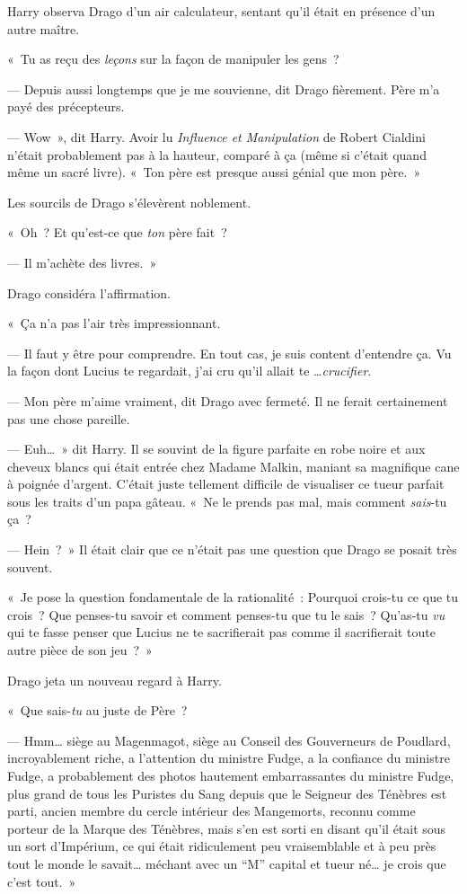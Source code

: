 Harry observa Drago d'un air calculateur, sentant qu'il était en présence d'un autre maître.

«~Tu as reçu des \emph{leçons} sur la façon de manipuler les gens~?

--- Depuis aussi longtemps que je me souvienne, dit Drago fièrement. Père m'a payé des précepteurs.

--- Wow~», dit Harry. Avoir lu \emph{Influence et Manipulation} de Robert Cialdini n'était probablement pas à la hauteur, comparé à ça (même si c'était quand même un sacré livre). «~Ton père est presque aussi génial que mon père.~»

Les sourcils de Drago s'élevèrent noblement.

«~Oh~? Et qu'est-ce que \emph{ton} père fait~?

--- Il m'achète des livres.~»

Drago considéra l'affirmation.

«~Ça n'a pas l'air très impressionnant.

--- Il faut y être pour comprendre. En tout cas, je suis content d'entendre ça. Vu la façon dont Lucius te regardait, j'ai cru qu'il allait te …\emph{crucifier}.

--- Mon père m'aime vraiment, dit Drago avec fermeté. Il ne ferait certainement pas une chose pareille.

--- Euh…~» dit Harry. Il se souvint de la figure parfaite en robe noire et aux cheveux blancs qui était entrée chez Madame Malkin, maniant sa magnifique cane à poignée d'argent. C'était juste tellement difficile de visualiser ce tueur parfait sous les traits d'un papa gâteau. «~Ne le prends pas mal, mais comment \emph{sais}-tu ça~?

--- Hein~?~» Il était clair que ce n'était pas une question que Drago se posait très souvent.

«~Je pose la question fondamentale de la rationalité~: Pourquoi crois-tu ce que tu crois~? Que penses-tu savoir et comment penses-tu que tu le sais~? Qu'as-tu \emph{vu} qui te fasse penser que Lucius ne te sacrifierait pas comme il sacrifierait toute autre pièce de son jeu~?~»

Drago jeta un nouveau regard à Harry.

«~Que sais-\emph{tu} au juste de Père~?

--- Hmm… siège au Magenmagot, siège au Conseil des Gouverneurs de Poudlard, incroyablement riche, a l'attention du ministre Fudge, a la confiance du ministre Fudge, a probablement des photos hautement embarrassantes du ministre Fudge, plus grand de tous les Puristes du Sang depuis que le Seigneur des Ténèbres est parti, ancien membre du cercle intérieur des Mangemorts, reconnu comme porteur de la Marque des Ténèbres, mais s'en est sorti en disant qu'il était sous un sort d'Impérium, ce qui était ridiculement peu vraisemblable et à peu près tout le monde le savait… méchant avec un “M” capital et tueur né… je crois que c'est tout.~»

